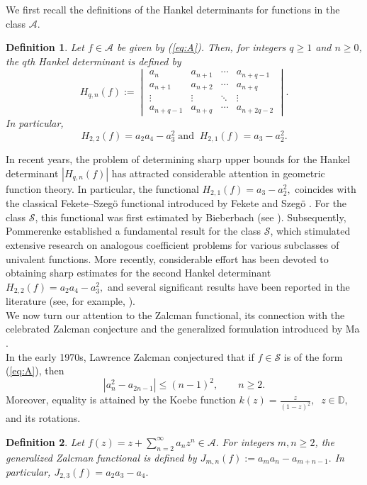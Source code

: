\documentclass[11pt, reqno]{amsart}
\newtheorem{defi}{Definition}[section]
\numberwithin{equation}{section}
\begin{document}
We first recall the definitions of the Hankel determinants for functions in the class $\mathcal{A}$.

\begin{defi}
Let \(f\in\mathcal{A}\) be given by (\ref{eq:A}). Then, for integers \(q\geq 1\) and \(n\geq 0\), the \(q\)th Hankel determinant is defined by
\[
H_{q,n}(f):=
\begin{vmatrix}
a_n & a_{n+1} & \cdots & a_{n+q-1}\\
a_{n+1} & a_{n+2} & \cdots & a_{n+q}\\
\vdots & \vdots & \ddots & \vdots\\
a_{n+q-1} & a_{n+q} & \cdots & a_{n+2q-2}
\end{vmatrix}.
\]
In particular,
\[
H_{2,2}(f)=a_2a_4-a_3^2 \;\text{and}\;\;H_{2,1}(f)=a_3-a_2^2.
\]
\end{defi}

In recent years, the problem of determining sharp upper bounds for the Hankel determinant
\(|H_{q,n}(f)|\) has attracted considerable attention in geometric function theory. In particular,
the functional $H_{2,1}(f)=a_3-a_2^2,$ coincides with the classical Fekete--Szeg\"o functional introduced by Fekete and Szeg\"o
\cite{FS1933}. For the class $\mathcal{S}$, this functional was first estimated by Bieberbach
(see \cite[Vol.~I, p.~35]{Goodman1983}). Subsequently, Pommerenke \cite{Pommerenke1966} established a fundamental
result for the class $\mathcal{S}$, which stimulated extensive research on analogous coefficient
problems for various subclasses of univalent functions. More recently, considerable effort has
been devoted to obtaining sharp estimates for the second Hankel determinant $H_{2,2}(f)=a_2a_4-a_3^2,$
and several significant results have been reported in the literature (see, for example,
\cite{CKKLS2018,CKKLS2017,XDL2026,XHX2025}).\\


We now turn our attention to the Zalcman functional, its connection with the celebrated Zalcman conjecture and the generalized formulation introduced by Ma \cite{M1999}. \\
In the early 1970s, Lawrence Zalcman conjectured that if \(f\in\mathcal{S}\) is of the form (\ref{eq:A}), then
\[
\left|a_n^2-a_{2n-1}\right|\le (n-1)^2,\qquad n\ge 2.
\]
Moreover, equality is attained by the Koebe function $k(z)=\frac{z}{(1-z)^2},\;\; z\in\mathbb{D},$
and its rotations.

\begin{defi}
Let $f(z)=z+\sum_{n=2}^{\infty}a_nz^n\in\mathcal{A}.$
For integers \(m,n\ge2\), the \emph{generalized Zalcman functional} is defined by
$J_{m,n}(f):=a_ma_n-a_{m+n-1}.$
In particular, $J_{2,3}(f)=a_2a_3-a_4.$
\end{defi}
\end{document}
